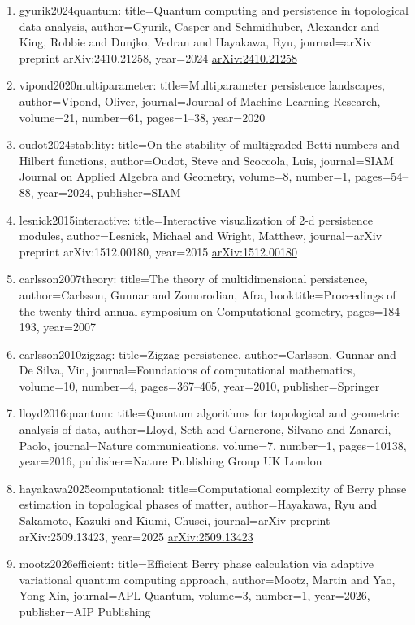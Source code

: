 \documentclass[11pt]{article}
\begin{document}
\begin{enumerate}[leftmargin=*]
  \item gyurik2024quantum: title=Quantum computing and persistence in topological data analysis, author=Gyurik, Casper and Schmidhuber, Alexander and King, Robbie and Dunjko, Vedran and Hayakawa, Ryu, journal=arXiv preprint arXiv:2410.21258, year=2024 \href{https://arxiv.org/abs/2410.21258}{arXiv:2410.21258}
  \item vipond2020multiparameter: title=Multiparameter persistence landscapes, author=Vipond, Oliver, journal=Journal of Machine Learning Research, volume=21, number=61, pages=1--38, year=2020
  \item oudot2024stability: title=On the stability of multigraded Betti numbers and Hilbert functions, author=Oudot, Steve and Scoccola, Luis, journal=SIAM Journal on Applied Algebra and Geometry, volume=8, number=1, pages=54--88, year=2024, publisher=SIAM
  \item lesnick2015interactive: title=Interactive visualization of 2-d persistence modules, author=Lesnick, Michael and Wright, Matthew, journal=arXiv preprint arXiv:1512.00180, year=2015 \href{https://arxiv.org/abs/1512.00180}{arXiv:1512.00180}
  \item carlsson2007theory: title=The theory of multidimensional persistence, author=Carlsson, Gunnar and Zomorodian, Afra, booktitle=Proceedings of the twenty-third annual symposium on Computational geometry, pages=184--193, year=2007
  \item carlsson2010zigzag: title=Zigzag persistence, author=Carlsson, Gunnar and De Silva, Vin, journal=Foundations of computational mathematics, volume=10, number=4, pages=367--405, year=2010, publisher=Springer
  \item lloyd2016quantum: title=Quantum algorithms for topological and geometric analysis of data, author=Lloyd, Seth and Garnerone, Silvano and Zanardi, Paolo, journal=Nature communications, volume=7, number=1, pages=10138, year=2016, publisher=Nature Publishing Group UK London
  \item hayakawa2025computational: title=Computational complexity of Berry phase estimation in topological phases of matter, author=Hayakawa, Ryu and Sakamoto, Kazuki and Kiumi, Chusei, journal=arXiv preprint arXiv:2509.13423, year=2025 \href{https://arxiv.org/abs/2509.13423}{arXiv:2509.13423}
  \item mootz2026efficient: title=Efficient Berry phase calculation via adaptive variational quantum computing approach, author=Mootz, Martin and Yao, Yong-Xin, journal=APL Quantum, volume=3, number=1, year=2026, publisher=AIP Publishing

\end{enumerate}
\end{document}
